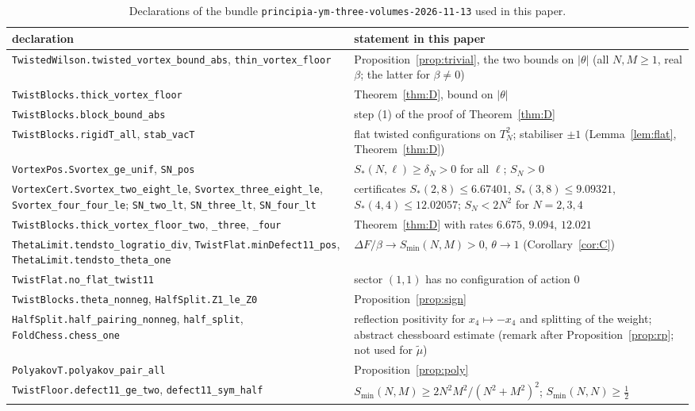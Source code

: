 \documentclass[11pt,a4paper]{article}
\theoremstyle{definition}
\theoremstyle{remark}
\newcommand{\code}[1]{\texttt{#1}}
\begin{document}
\begin{table}[ht]\centering\footnotesize
\caption{Declarations of the bundle \code{principia-ym-three-volumes-2026-11-13} used in this paper.}\label{tab:lean}
\begin{tabular}{p{}p{}}\toprule
declaration & statement in this paper \\\midrule
\code{TwistedWilson.twisted\_vortex\_bound\_abs}, \code{thin\_vortex\_floor} & Proposition~\ref{prop:trivial}, the two bounds on $|\theta|$ (all $N,M\ge1$, real $\beta$; the latter for $\beta\ne0$) \\
\code{TwistBlocks.thick\_vortex\_floor} & Theorem~\ref{thm:D}, bound on $|\theta|$ \\
\code{TwistBlocks.block\_bound\_abs} & step (1) of the proof of Theorem~\ref{thm:D} \\
\code{TwistBlocks.rigidT\_all}, \code{stab\_vacT} & flat twisted configurations on $T^2_N$; stabiliser $\pm1$ (Lemma~\ref{lem:flat}, Theorem~\ref{thm:D}) \\
\code{VortexPos.Svortex\_ge\_unif}, \code{SN\_pos} & $S_*(N,\ell)\ge\delta_N>0$ for all $\ell$; $S_N>0$ \\
\code{VortexCert.Svortex\_two\_eight\_le}, \code{Svortex\_three\_eight\_le}, \code{Svortex\_four\_four\_le}; \code{SN\_two\_lt}, \code{SN\_three\_lt}, \code{SN\_four\_lt} & certificates $S_*(2,8)\le6.67401$, $S_*(3,8)\le9.09321$, $S_*(4,4)\le12.02057$; $S_N<2N^2$ for $N=2,3,4$ \\
\code{TwistBlocks.thick\_vortex\_floor\_two}, \code{\_three}, \code{\_four} & Theorem~\ref{thm:D} with rates $6.675$, $9.094$, $12.021$ \\
\code{ThetaLimit.tendsto\_logratio\_div}, \code{TwistFlat.minDefect11\_pos}, \code{ThetaLimit.tendsto\_theta\_one} & $\Delta F/\beta\to S_{\min}(N,M)>0$, $\theta\to1$ (Corollary~\ref{cor:C}) \\
\code{TwistFlat.no\_flat\_twist11} & sector $(1,1)$ has no configuration of action $0$ \\
\code{TwistBlocks.theta\_nonneg}, \code{HalfSplit.Z1\_le\_Z0} & Proposition~\ref{prop:sign} \\
\code{HalfSplit.half\_pairing\_nonneg}, \code{half\_split}, \code{FoldChess.chess\_one} & reflection positivity for $x_4\mapsto-x_4$ and splitting of the weight; abstract chessboard estimate (remark after Proposition~\ref{prop:rp}; not used for $\tilde\mu$) \\
\code{PolyakovT.polyakov\_pair\_all} & Proposition~\ref{prop:poly} \\
\code{TwistFloor.defect11\_ge\_two}, \code{defect11\_sym\_half} & $S_{\min}(N,M)\ge2N^2M^2/(N^2+M^2)^2$; $S_{\min}(N,N)\ge\frac12$ \\\bottomrule
\end{tabular}
\end{table}
\end{document}
